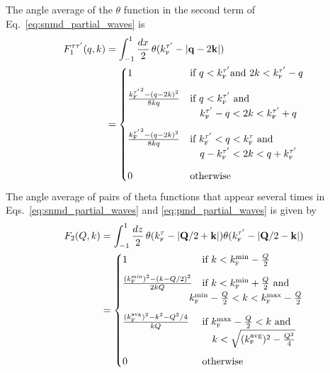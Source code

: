 \documentclass[10pt,aps,prc,floatfix,twocolumn,nofootinbib]{revtex4-1}
\begin{document}
The angle average of the $\theta$ function in the second term of Eq.~\eqref{eq:snmd_partial_waves} is
%
\begin{align}
    F_1^{\tau\tau'}(q,k) &= \int_{-1}^1 \frac{dx}{2}\,\theta(k_{\scriptscriptstyle{\text F}}^{\tau'}-\abs{\mathbf{q}-2\mathbf{k}}) \notag \\
    &=
  \begin{cases} 
   1 & \text{if } q < k_{\scriptscriptstyle{\text F}}^{\tau'} \text{and\ } 2k < k_{\scriptscriptstyle{\text F}}^{\tau'} - q\\[8pt]
   \frac{{k_{\scriptscriptstyle{\text F}}^{\tau'}}^2 - (q-2k)^2}{8kq}  &  \text{if } q < k_{\scriptscriptstyle{\text F}}^{\tau'}\ \text{and\ } \\
   & \quad k_{\scriptscriptstyle{\text F}}^{\tau'} - q < 2k < k_{\scriptscriptstyle{\text F}}^{\tau'} + q \\[8pt]
   \frac{{k_{\scriptscriptstyle{\text F}}^{\tau'}}^2 - (q-2k)^2}{8kq} & \text{if }  k_{\scriptscriptstyle{\text F}}^{\tau'} < q < k_{\scriptscriptstyle{\text F}}^{\tau}\  \text{and\ } \\
   & \quad q - k_{\scriptscriptstyle{\text F}}^{\tau'}  < 2k < q + k_{\scriptscriptstyle{\text F}}^{\tau'} \\[8pt]
   0 & \text{otherwise}
  \end{cases}
\end{align}
%
%
The angle average of pairs of theta functions that appear several times in Eqs.~\eqref{eq:snmd_partial_waves} and \eqref{eq:pmd_partial_waves} 
is given  by
%
\begin{align}
    F_2(Q,k) &= \int_{-1}^{1}\frac{dz}{2}\,
    \theta(\kF^{\tau}-\abs{\Qvec/2+\kvec}) 
                    \theta(\kF^{\tau'} - \abs{\Qvec/2-\kvec})
                    \notag \\
  &= 
  \begin{cases} 
  1 & \text{if } k < \kFmin - \frac{Q}{2}\\[8pt]
  \frac{(\kFmin)^2 - (k - Q/2)^2}{2kQ}  &  \text{if } k < \kFmin + \frac{Q}{2} \text{\ and\ } \\
  & \hspace*{-13pt}\kFmin - \frac{Q}{2} < k < \kFmax - \frac{Q}{2} \\[8pt]
  \frac{(\kFavg)^2 - k^2 - Q^2/4}{kQ}  &  \text{if } \kFmax - \frac{Q}{2} < k  \text{\ and\ } \\
  & \quad k < \sqrt{(\kFavg)^2 - \frac{Q^2}{4}} \\[8pt]
  0 & \text{otherwise} 
  \end{cases}
\end{align}
\end{document}
